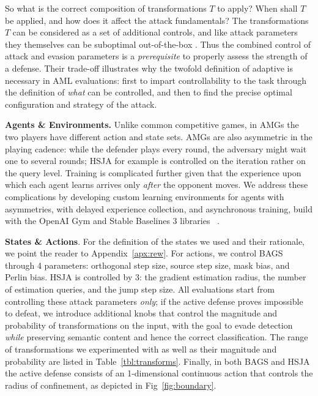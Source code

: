 So what is the correct composition of transformations $T$ to apply?
When shall $T$ be applied, and how does it affect the attack fundamentals?
The transformations $T$ can be considered as a set of additional controls, and like attack parameters they themselves can be suboptimal out-of-the-box \cite{croce2020reliable}.
Thus the combined control of attack and evasion parameters is a \emph{prerequisite} to properly assess the strength of a defense.
Their trade-off illustrates why the twofold definition of adaptive is necessary in \gls{AML} evaluations: first to impart controllability to the task through the definition of \textit{what} can be controlled, and then to find the precise optimal configuration and strategy of the attack.

\textbf{Agents \& Environments.} Unlike common competitive games, in AMGs the two players have different action and state sets.
AMGs are also asymmetric in the playing cadence: while the defender plays every round, the adversary might wait one to several rounds; HSJA for example is controlled on the iteration rather on the query level.
Training is complicated further given that the experience upon which each agent learns arrives only \emph{after} the opponent moves.
We address these complications by developing custom learning environments for agents with asymmetries, with delayed experience collection, and asynchronous training, build with the OpenAI Gym and Stable Baselines 3 libraries ~\cite{brockman2016openai, raffin2019stable}.

\textbf{States \& Actions}. 
For the definition of the states we used and their rationale, we point the reader to Appendix~\ref{apx:rew}.
For actions, we control BAGS through 4 parameters: orthogonal step size, source step size, mask bias, and Perlin bias.
HSJA is controlled by 3: the gradient estimation radius, the number of estimation queries, and the jump step size.
All evaluations start from controlling these attack parameters \textit{only}; if the active defense proves impossible to defeat, we introduce additional knobs that control the magnitude and probability of transformations on the input, with the goal to evade detection \emph{while} preserving semantic content and hence the correct classification.
The range of transformations we experimented with as well as their magnitude and probability are listed in Table~\ref{tbl:transforms}.
Finally, in both BAGS and HSJA the active defense consists of an 1-dimensional continuous action that controls the radius of confinement, as depicted in Fig~\ref{fig:boundary}.


